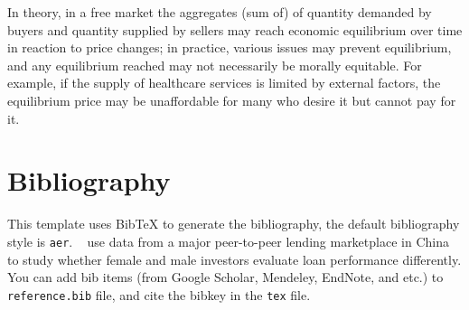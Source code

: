 \documentclass[titlestyle=hang,11pt]{elegantbook}
\begin{document}
\begin{conclusion}
In theory, in a free market the aggregates (sum of) of quantity demanded by buyers and quantity supplied by sellers may reach economic equilibrium over time in reaction to price changes; in practice, various issues may prevent equilibrium, and any equilibrium reached may not necessarily be morally equitable. For example, if the supply of healthcare services is limited by external factors, the equilibrium price may be unaffordable for many who desire it but cannot pay for it.
\end{conclusion}

\section{Bibliography}
This template uses Bib\TeX{} to generate the bibliography, the default bibliography style is \verb|aer|. ~\cite{Chen2018} use data from a major peer-to-peer lending marketplace in China to study whether female and male investors evaluate loan performance differently. You can add bib items (from Google Scholar, Mendeley, EndNote, and etc.) to \verb|reference.bib| file, and cite the bibkey in the \verb|tex| file.


\nocite{EINAV2010,Havrylchyk2018}




\end{document}
